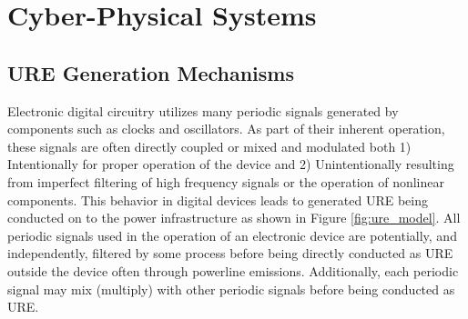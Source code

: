 \chapter{Cyber-Physical Systems} 
\label{Cyber-Physical Systems Chapter}

\section[URE Generation Mechanisms]{URE Generation Mechanisms}

Electronic digital circuitry utilizes many periodic signals generated by components such as clocks and oscillators. As part of their inherent operation, these signals are often directly coupled or mixed and modulated both 1) Intentionally for proper operation of the device and 2) Unintentionally resulting from imperfect filtering of high frequency signals or the operation of nonlinear components. This behavior in digital devices leads to generated URE being conducted on to the power infrastructure as shown in Figure \ref{fig:ure_model}. All periodic signals used in the operation of an electronic device are potentially, and independently, filtered by some process before being directly conducted as URE outside the device often through powerline emissions.  Additionally, each periodic signal may mix (multiply) with other periodic signals before being conducted as URE.

